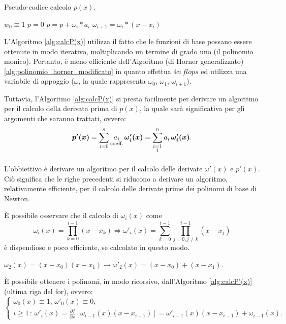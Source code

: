 \begin{algorithm}\caption{Pseudo-codice calcolo $p(x)$.}\label{alg:calcP(x)}
    \begin{algorithmic}
        \State $w_0\equiv 1$
        \State $p = 0$
            \State $p = p + \omega_i * a_i$
            \State $\omega_{i+1} = \omega_i *(x - x_i)$
        \EndFor
    \end{algorithmic}
\end{algorithm}

L'Algoritmo \ref{alg:calcP(x)} utilizza il fatto che le funzioni di base possano essere ottenute in modo iterativo, moltiplicando un termine di grado uno (il polinomio monico). Pertanto, è meno efficiente dell'Algoritmo (di Horner generalizzato) \ref{alg:polinomio_horner_modificato} in quanto effettua $4n\, flops$ ed utilizza una variabile di appoggio ($\omega$, la quale rappresenta $\omega_0,\,\omega_1,\,\omega_{i+1}$).

Tuttavia, l'Algoritmo \ref{alg:calcP(x)} si presta facilmente per derivare un algoritmo per il calcolo della derivata prima di $p(x)$, la quale sarà significativa per gli argomenti che saranno trattati, ovvero:
\begin{equation*}
    \boldsymbol{p'(x)}=\sum_{i=0}^n\underset{\text{coeff.}}{a_i}\,\boldsymbol{\omega'_i(x)}=\sum_{\underset{\footnotemark}{i=1}}^na_i\,\boldsymbol{\omega'_i(x)}.
\end{equation*}

L'obbiettivo è derivare un algoritmo per il calcolo delle derivate $\omega'(x)$ e $p'(x)$. Ciò significa che le righe precedenti si riducono a derivare un algoritmo, relativamente efficiente, per il calcolo delle derivate prime dei polinomi di base di Newton.

È possibile osservare che il calcolo di $\omega_i(x)$ come
\begin{equation*}
    \omega_i(x)=\prod_{k=0}^{i-1}(x-x_k)\Rightarrow \omega'_i(x)=\sum_{k=0}^{i-1}\prod_{j=0,j\neq k}^{i-1}(x-x_j)
\end{equation*}
è dispendioso e poco efficiente, se calcolato in questo modo.

\begin{example}
    $\omega_2(x)=(x-x_0)(x-x_1) \rightarrow \omega'_2(x)=(x-x_0)+(x-x_1)$.
\end{example}

\begin{remark}
    È possibile ottenere i polinomi, in modo ricorsivo, dall'Algoritmo \ref{alg:calcP'(x)} (ultima riga del for), ovvero:
    \begin{equation*}
        \begin{cases}
            \omega_0(x)\equiv 1,\, \omega'_0(x)\equiv 0,\\
            i\geq 1\,:\, \omega'_i(x)=\frac{\partial f}{\partial x}[\omega_{i-1}(x)(x-x_{i-1})] = \omega'_{i-1}(x)(x-x_{i-1})+\omega_{i-1}(x).
        \end{cases}
    \end{equation*}
\end{remark}

